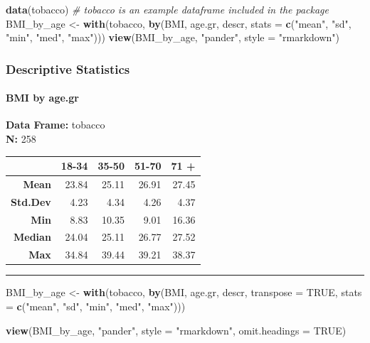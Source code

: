 \documentclass[]{article}
\newenvironment{Shaded}{\begin{snugshade}}{\end{snugshade}}
\newcommand{\CommentTok}[1]{\textcolor[rgb]{0.56,0.35,0.01}{\textit{#1}}}
\newcommand{\DataTypeTok}[1]{\textcolor[rgb]{0.13,0.29,0.53}{#1}}
\newcommand{\KeywordTok}[1]{\textcolor[rgb]{0.13,0.29,0.53}{\textbf{#1}}}
\newcommand{\NormalTok}[1]{#1}
\newcommand{\OtherTok}[1]{\textcolor[rgb]{0.56,0.35,0.01}{#1}}
\newcommand{\StringTok}[1]{\textcolor[rgb]{0.31,0.60,0.02}{#1}}
\let\oldparagraph\paragraph
\renewcommand{\paragraph}[1]{\oldparagraph{#1}\mbox{}}
\begin{document}
\begin{Shaded}
\begin{Highlighting}[]
\KeywordTok{data}\NormalTok{(tobacco)  }\CommentTok{# tobacco is an example dataframe included in the package}
\NormalTok{BMI_by_age <-}\StringTok{ }\KeywordTok{with}\NormalTok{(tobacco, }\KeywordTok{by}\NormalTok{(BMI, age.gr, descr, }\DataTypeTok{stats =} \KeywordTok{c}\NormalTok{(}\StringTok{"mean"}\NormalTok{, }\StringTok{"sd"}\NormalTok{, }\StringTok{"min"}\NormalTok{, }
    \StringTok{"med"}\NormalTok{, }\StringTok{"max"}\NormalTok{)))}
\KeywordTok{view}\NormalTok{(BMI_by_age, }\StringTok{"pander"}\NormalTok{, }\DataTypeTok{style =} \StringTok{"rmarkdown"}\NormalTok{)}
\end{Highlighting}
\end{Shaded}

\hypertarget{descriptive-statistics-2}{%
\subsubsection{Descriptive Statistics}\label{descriptive-statistics-2}}

\hypertarget{bmi-by-age.gr}{%
\paragraph{BMI by age.gr}\label{bmi-by-age.gr}}

\textbf{Data Frame:} tobacco\\
\textbf{N:} 258

\begin{longtable}[]{@{}rrrrr@{}}
\toprule
~ & 18-34 & 35-50 & 51-70 & 71 +\tabularnewline
\midrule
\endhead
\textbf{Mean} & 23.84 & 25.11 & 26.91 & 27.45\tabularnewline
\textbf{Std.Dev} & 4.23 & 4.34 & 4.26 & 4.37\tabularnewline
\textbf{Min} & 8.83 & 10.35 & 9.01 & 16.36\tabularnewline
\textbf{Median} & 24.04 & 25.11 & 26.77 & 27.52\tabularnewline
\textbf{Max} & 34.84 & 39.44 & 39.21 & 38.37\tabularnewline
\bottomrule
\end{longtable}

\begin{center}\rule{0.5\linewidth}{\linethickness}\end{center}

\begin{Shaded}
\begin{Highlighting}[]
\NormalTok{BMI_by_age <-}\StringTok{ }\KeywordTok{with}\NormalTok{(tobacco, }\KeywordTok{by}\NormalTok{(BMI, age.gr, descr, }\DataTypeTok{transpose =} \OtherTok{TRUE}\NormalTok{, }\DataTypeTok{stats =} \KeywordTok{c}\NormalTok{(}\StringTok{"mean"}\NormalTok{, }
    \StringTok{"sd"}\NormalTok{, }\StringTok{"min"}\NormalTok{, }\StringTok{"med"}\NormalTok{, }\StringTok{"max"}\NormalTok{)))}

\KeywordTok{view}\NormalTok{(BMI_by_age, }\StringTok{"pander"}\NormalTok{, }\DataTypeTok{style =} \StringTok{"rmarkdown"}\NormalTok{, }\DataTypeTok{omit.headings =} \OtherTok{TRUE}\NormalTok{)}
\end{Highlighting}
\end{Shaded}
\end{document}
